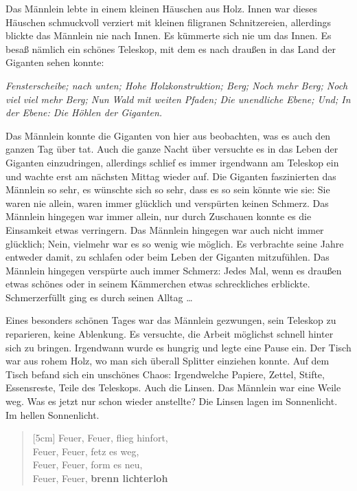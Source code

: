 \documentclass{article}
\title{\vspace{-2cm}\titlevar}
\author{\authorvar}
\date{\datevar}
\begin{document}
	\maketitle
	 
	Das Männlein lebte in einem kleinen Häuschen aus Holz. Innen war dieses Häuschen schmuckvoll verziert mit kleinen filigranen Schnitzereien, allerdings blickte das Männlein nie nach Innen. Es kümmerte sich nie um das Innen. Es besaß nämlich ein schönes Teleskop, mit dem es nach draußen in das Land der Giganten sehen konnte:  
	
	\textit{Fensterscheibe; nach unten; Hohe Holzkonstruktion; Berg; Noch mehr Berg; Noch viel viel mehr Berg; Nun Wald mit weiten Pfaden; Die unendliche Ebene; Und; In der Ebene: Die Höhlen der Giganten.}
	
	Das Männlein konnte die Giganten von hier aus beobachten, was es auch den ganzen Tag über tat. Auch die ganze Nacht über versuchte es in das Leben der Giganten einzudringen, allerdings schlief es immer irgendwann am Teleskop ein und wachte erst am nächsten Mittag wieder auf. Die Giganten faszinierten das Männlein so sehr, es wünschte sich so sehr, dass es so sein könnte wie sie: Sie waren nie allein, waren immer glücklich und verspürten keinen Schmerz. Das Männlein hingegen war immer allein, nur durch Zuschauen konnte es die Einsamkeit etwas verringern. Das Männlein hingegen war auch nicht immer glücklich; Nein, vielmehr war es so wenig wie möglich. Es verbrachte seine Jahre entweder damit, zu schlafen oder beim Leben der Giganten mitzufühlen. Das Männlein hingegen verspürte auch immer Schmerz: Jedes Mal, wenn es draußen etwas schönes oder in seinem Kämmerchen etwas schreckliches erblickte. Schmerzerfüllt ging es durch seinen Alltag \dots
	 
	Eines besonders schönen Tages war das Männlein gezwungen, sein Teleskop zu reparieren, keine Ablenkung. Es versuchte, die Arbeit möglichst schnell hinter sich zu bringen. Irgendwann wurde es hungrig und legte eine Pause ein. Der Tisch war aus rohem Holz, wo man sich überall Splitter einziehen konnte. Auf dem Tisch befand sich ein unschönes Chaos: Irgendwelche Papiere, Zettel, Stifte, Essensreste, Teile des Teleskops. Auch die Linsen. Das Männlein war eine Weile weg. Was es jetzt nur schon wieder anstellte? Die Linsen lagen im Sonnenlicht. Im hellen Sonnenlicht.  
	
	\begin{verse}[5cm]
		Feuer, Feuer, flieg hinfort,  \\
		Feuer, Feuer, fetz es weg, \\ 
		Feuer, Feuer, form es neu, \\
		Feuer, Feuer, \textbf{brenn lichterloh\!}
	\end{verse}
	
\end{document}
